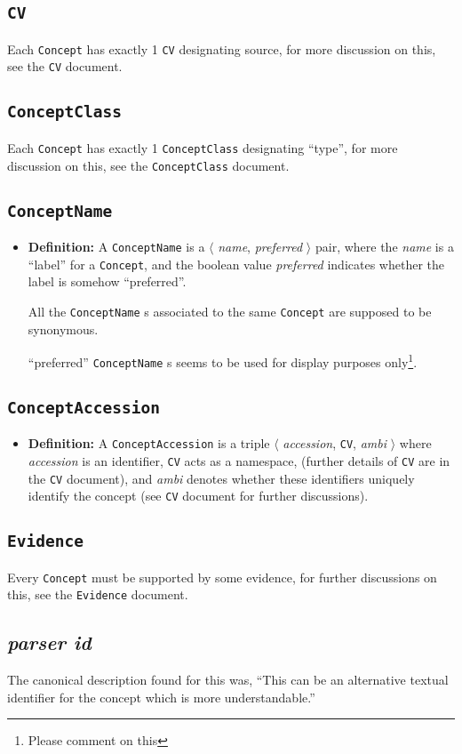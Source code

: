 \documentclass[a4paper,10pt]{article}
\newcommand{\defn}[1]{\begin{itemize}\item\textbf{Definition: }#1\end{itemize}}
\newcommand{\field}[1]{\textit{#1}\xspace}
\newcommand{\term}[1]{\texttt{#1}\xspace}
\newcommand{\cc}{\term{ConceptClass}}
\newcommand{\co}{\term{Concept}}
\newcommand{\ca}{\term{ConceptAccession}}
\newcommand{\cn}{\term{ConceptName}}
\begin{document}
\subsection{\term{CV}}
Each \co has exactly 1 \term{CV} designating source, for more discussion on this, see the \term{CV} document.

\subsection{\cc}
Each \co has exactly 1 \cc designating ``type'', for more discussion on this, see the \cc document.

\subsection{\cn}
\defn{A \cn is a $\langle$ \field{name}, \field{preferred} $\rangle$ pair, where the \field{name} is a ``label'' for a \co, and the boolean value \field{preferred} indicates whether the label is somehow ``preferred''.

All the \cn s associated to the same \co are supposed to be synonymous.

``preferred'' \cn s seems to be used for display purposes only\footnote{Please comment on this}.
}

\subsection{\ca}
\defn{A \ca is a triple $\langle$ \field{accession}, \term{CV}, \field{ambi} $\rangle$ where \field{accession} is an identifier, \term{CV} acts as a namespace, (further details of \term{CV} are in the \term{CV}document), and \field{ambi} denotes whether these identifiers uniquely identify the concept (see \term{CV} document for further discussions).}

\subsection{\term{Evidence}}
Every \co must be supported by some evidence, for further discussions on this, see the \term{Evidence} document.

\subsection{\field{parser id}}
The canonical description found for this was, ``This can be an alternative textual identifier for the concept which is more understandable.''
\end{document}
